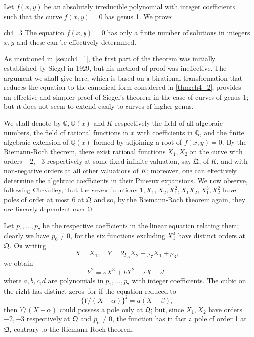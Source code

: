 Let $f(x,y)$ be an absolutely irreducible polynomial with integer coefficients such that the curve $f(x, y) = 0$ has genus 1. We prove:

\begin{mythm}{}{ch4_3}
The equation $f(x,y) = 0$ has only a finite number of solutions in integers $x, y$ and these can be effectively determined.
\end{mythm}

As mentioned in \autoref{sec:ch4_1}, the first part of the theorem was initially established by Siegel in 1929, but his method of proof was ineffective. The argument we shall give here, which is based on a birational transformation that reduces the equation to the canonical form considered in \autoref{thm:ch4_2}, provides an effective and simpler proof of Siegel's theorem in the case of curves of genus 1; but it does not seem to extend easily to curves of higher genus.

We shall denote by $\mathbb{Q}, \mathbb{Q}(x)$ and $K$ respectively the field of all algebraic numbers, the field of rational functions in $x$ with coefficients in $\mathbb{Q}$, and the finite algebraic extension of $\mathbb{Q}(x)$ formed by adjoining a root of $f(x, y) = 0$. By the Riemann-Roch theorem, there exist rational functions $X_1, X_2$ on the curve with orders $-2, -3$ respectively at some fixed infinite valuation, say $\mathfrak{Q}$, of $K$, and with non-negative orders at all other valuations of $K$; moreover, one can effectively determine the algebraic coefficients in their Puiseux expansions. We now observe, following Chevalley, that the seven functions $1, X_1, X_2, X_1^2, X_1 X_2, X_1^3, X_2^2$ have poles of order at most 6 at $\mathfrak{Q}$ and so, by the Riemann-Roch theorem again, they are linearly dependent over $\mathbb{Q}$.

Let $p_1, \dots, p_7$ be the respective coefficients in the linear equation relating them; clearly we have $p_6 \neq 0$, for the six functions excluding $X_1^3$ have distinct orders at $\mathfrak{Q}$. On writing
\[
X = X_1, \quad Y = 2p_5 X_2 + p_7 X_1 + p_3,
\]
we obtain
\[
Y^2 = aX^3 + bX^2 + cX + d,
\]
where $a, b, c, d$ are polynomials in $p_1, \dots, p_7$ with integer coefficients. The cubic on the right has distinct zeros, for if the equation reduced to
\[
\{Y/(X-\alpha)\}^2=a(X-\beta),
\]
then $Y/(X - \alpha)$ could possess a pole only at $\mathfrak{Q}$; but, since $X_1, X_2$ have orders $-2, -3$ respectively at $\mathfrak{Q}$ and $p_6 \neq 0$, the function has in fact a pole of order 1 at $\mathfrak{Q}$, contrary to the Riemann-Roch theorem.

